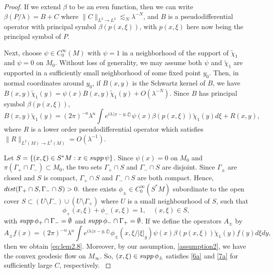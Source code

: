 \documentclass[10pt,a4paper]{amsart}
\newcommand{\la}{\lambda}
\begin{document}
\begin{proof}
If we extend $\beta$ to be an even function, then we can write $\beta(P/\la)=B+C$ where $ \|C\|_{L^2\to L^2}\lesssim_N \la^{-N}$, and $B$ is a pseudodifferential operator with principal symbol $\beta(p(x,\xi))$,
with $p(x,\xi)$ here now being the principal symbol of $P$. 

Next, choose $\psi\in C_0^\infty{(M)}$ with $\psi=1$ in a neighborhood of the support of $\tilde\chi_1$  and $\psi=0$ on $M_0$. Without loss of generality, we may assume both $\psi$ and $\tilde \chi_1$ are supported in a sufficiently small neighborhood of some fixed point $y_0$. Then, in normal coordinates around $y_0$, if $B(x,y)$ is the {Schwartz} kernel of $B$, 
we have $B(x,y)\tilde\chi_1(y)=\psi(x)B(x,y)\tilde \chi_1(y)+O(\la^{-N})$. {Since $B$ has principal symbol $\beta(p(x,\xi))$},
\begin{equation}\label{2.95a}
    B(x,y)\tilde\chi_1(y)=(2\pi)^{-n}\la^n\int e^{i\la\langle x-y,\xi \rangle} \psi(x){\beta(p(x,\xi))}\tilde\chi_1(y)d\xi +R(x,y),
\end{equation}
where $R$ is a lower order {pseudodifferential} operator which satisfies $ \|R\|_{L^2(M)\to L^2(M)}=O(\la^{-1})
$.

{Let $S=\{(x,\xi)\in S^*M: x\in \textnormal{supp}\,\psi \}$. 
Since $\psi(x)=0$ on $M_0$ and $\pi(\Gamma_+\cap \Gamma_-)\subset M_0$, the two sets $\Gamma_+\cap S$ and $\Gamma_-\cap S$ are disjoint. Since $\Gamma_\pm$ are closed and $S$ is compact, $\Gamma_+\cap S$ and $\Gamma_-\cap S$ are both compact. Hence, $\textnormal{dist}(\Gamma_+\cap S,\Gamma_-\cap S)>0.$
there exists $\phi_{\pm}\in C_0^{\infty}(S^*M)$ subordinate to the open cover $S\subset (U\setminus \Gamma_-)\cup (U\setminus \Gamma_+)$ where $U$ is a small neighbourhood of $S$, such that
\begin{equation}
    \phi_+(x,\xi) +\phi_-(x,\xi) =1,\quad (x,\xi)\in S,
\end{equation}
with $\textnormal{supp}\,\phi_+ \cap \Gamma_-=\emptyset$ 
 and $\textnormal{supp}\,\phi_- \cap \Gamma_+=\emptyset$. If we define the operators $A_\pm$ by 
\begin{equation}\label{10}
   A_\pm f(x)=(2\pi)^{-n}\la^n\int e^{i\la\langle x-y,\xi \rangle} \phi_{\pm}(x,\xi/|\xi|_g)\psi(x)\beta(p(x,\xi))\tilde\chi_1(y) f(y)d\xi dy,
\end{equation}
then we obtain \eqref{eq:lem2.8}. Moreover, by our assumption, \eqref{assumption2}, we have the convex geodesic flow on $M_\infty$. So,  $(x,\xi)\in \textnormal{supp} \, \phi_{\pm}$ satisfies \eqref{6a} and \eqref{7a} for sufficiently large $C$, respectively.
}
\end{proof}
\end{document}
